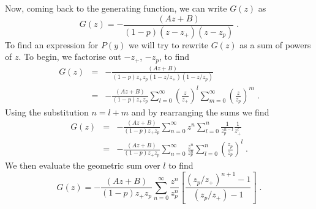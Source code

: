 \documentclass[a4paper,10pt]{article}
\begin{document}
Now, coming back to the generating function, we can write $G(z)$ as 
\begin{equation}
  G(z) = - \frac{(Az + B)}{(1-p)(z-z_+)(z-z_p)} \;.
\end{equation}
To find an expression for $P(y)$ we will try to rewrite $G(z)$ as a sum of powers of $z$. To begin, we factorise out $-z_+$, $-z_p$, to find
\begin{eqnarray}
  G(z) &=& - \frac{(Az + B)}{(1-p)z_+z_p(1-z/z_+)(1-z/z_p)} \nonumber \\
       &=& - \frac{(Az + B)}{(1-p)z_+z_p} \sum_{l=0}^\infty \left(\frac{z}{z_+}\right)^l \sum_{m=0}^\infty \left(\frac{z}{z_p}\right)^m \;. 
\end{eqnarray}
Using the substitution $n=l+m$ and by rearranging the sums we find
\begin{eqnarray}
  G(z) &=& - \frac{(Az + B)}{(1-p)z_+z_p} \sum_{n=0}^\infty z^n \sum_{l=0}^n \frac{1}{z_p^{n-l}}\frac{1}{z_+^l} \nonumber \\
       &=& - \frac{(Az + B)}{(1-p)z_+z_p} \sum_{n=0}^\infty \frac{z^n}{z_p^n} \sum_{l=0}^n \left(\frac{z_p}{z_p}\right)^l \;.
\end{eqnarray}
We then evaluate the geometric sum over $l$ to find
\begin{equation}
 G(z) = - \frac{(Az + B)}{(1-p)z_+z_p} \sum_{n=0}^\infty \frac{z^n}{z_p^n} \left[ \frac{ (z_p/z_+)^{n+1} -1 }{(z_p/z_+) - 1} \right] \;.
\end{equation}
\end{document}
